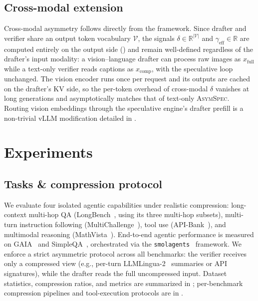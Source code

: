 \documentclass[11pt]{article}
\theoremstyle{plain}
\theoremstyle{definition}
\begin{document}
\subsection{Cross-modal extension}
\label{sec:method-mm}
Cross-modal asymmetry follows directly from the framework. Since drafter and verifier share an output token vocabulary $\mathcal{V}$, the signals $\delta\in\mathbb{R}^{|\mathcal{V}|}$ and $\gamma_{\text{eff}}\in\mathbb{R}$ are computed entirely on the output side () and remain well-defined regardless of the drafter's input modality: a vision--language drafter can process raw images as $x_{\text{full}}$ while a text-only verifier reads captions as $x_{\text{comp}}$, with the speculative loop unchanged. The vision encoder runs once per request and its outputs are cached on the drafter's KV side, so the per-token overhead of cross-modal $\delta$ vanishes at long generations and asymptotically matches that of text-only \textsc{AsymSpec}. Routing vision embeddings through the speculative engine's drafter prefill is a non-trivial vLLM modification detailed in .

\section{Experiments}
\label{sec:setup}

\subsection{Tasks \& compression protocol}
We evaluate four isolated agentic capabilities under realistic compression: long-context multi-hop QA (LongBench~\citep{bai2024longbench}, using its three multi-hop subsets), multi-turn instruction following (MultiChallenge~\citep{sirdeshmukh2025multichallenge}), tool use (API-Bank~\citep{li2023apibank}), and multimodal reasoning (MathVista~\citep{lu2024mathvista}). End-to-end agentic performance is measured on GAIA~\citep{mialon2023gaia} and SimpleQA~\citep{wei2024simpleqa}, orchestrated via the \texttt{smolagents}~\citep{smolagents} framework. We enforce a strict asymmetric protocol across all benchmarks: the verifier receives only a compressed view (e.g., per-turn LLMLingua-2~\citep{llmlingua2024} summaries or API signatures), while the drafter reads the full uncompressed input. Dataset statistics, compression ratios, and metrics are summarized in ; per-benchmark compression pipelines and tool-execution protocols are in .
\end{document}
